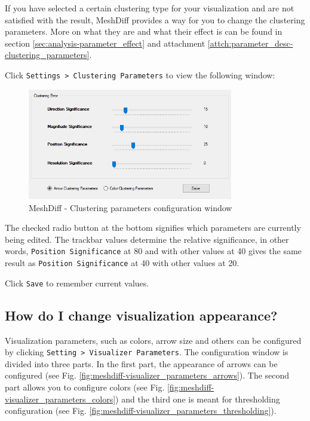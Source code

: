 If you have selected a certain clustering type for your visualization and are not satisfied with the result, MeshDiff provides a way for you to change the clustering parameters. More on what they are and what their effect is can be found in section \ref{sec:analysis-parameter_effect} and attachment \ref{attch:parameter_desc-clustering_parameters}.

Click \verb+Settings > Clustering Parameters+ to view the following window:

\begin{figure}[h]
	\centering
	\includegraphics[width=0.8\textwidth]{./img/meshdiff-clustering_parameters.PNG}
	\caption[MeshDiff - Clustering parameters]{MeshDiff - Clustering parameters configuration window}
	\label{fig:meshdiff-clustering_parameters_window}
\end{figure}

The checked radio button at the bottom signifies which parameters are currently being edited. The trackbar values determine the relative significance, in other words, \verb+Position Significance+ at 80 and with other values at 40 gives the same result as \verb+Position Significance+ at 40 with other values at 20.

Click \verb+Save+ to remember current values.

\subsection{How do I change visualization appearance?}
\label{attch:user_doc_vis_params}

Visualization parameters, such as colors, arrow size and others can be configured by clicking \verb+Setting > Visualizer Parameters+. The configuration window is divided into three parts. In the first part, the appearance of arrows can be configured (see Fig. \ref{fig:meshdiff-visualizer_parameters_arrows}). The second part allows you to configure colors (see Fig. \ref{fig:meshdiff-visualizer_parameters_colors}) and the third one is meant for thresholding configuration (see Fig. \ref{fig:meshdiff-visualizer_parameters_thresholding}).

